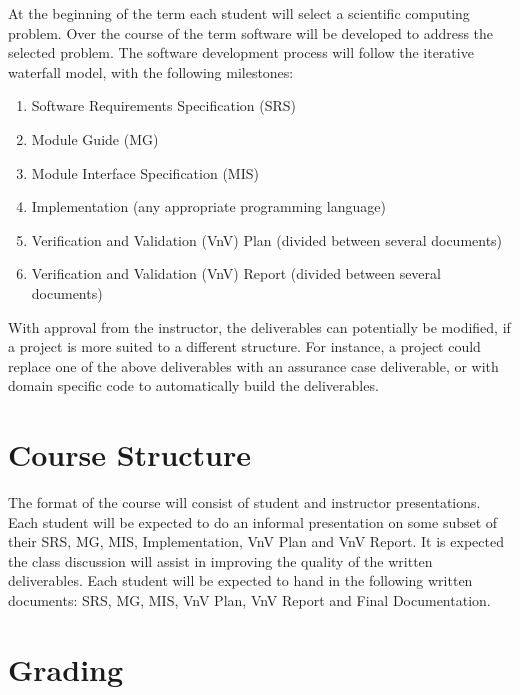 \documentclass[12pt]{article}
\begin{document}
At the beginning of the term each student will select a scientific computing
problem.  Over the course of the term software will be developed to address the
selected problem.  The software development process will follow the iterative
waterfall model, with the following milestones:

\begin {enumerate}

\item Software Requirements Specification (SRS)
\item Module Guide (MG)
\item Module Interface Specification (MIS)
\item Implementation (any appropriate programming language)
\item Verification and Validation (VnV) Plan (divided between several documents)
\item Verification and Validation (VnV) Report (divided between several documents) 

\end {enumerate}

With approval from the instructor, the deliverables can potentially be modified,
if a project is more suited to a different structure.  For instance, a project
could replace one of the above deliverables with an assurance case deliverable,
or with domain specific code to automatically build the deliverables.

\section {Course Structure}

The format of the course will consist of student and instructor presentations.
Each student will be expected to do an informal presentation on some subset of their SRS, MG,
MIS, Implementation, VnV Plan and VnV Report.  It is expected the class discussion will
assist in improving the quality of the written deliverables.  Each student will
be expected to hand in the following written documents: SRS, MG, MIS, VnV Plan,
VnV Report and Final Documentation.

\section {Grading}
\end{document}
